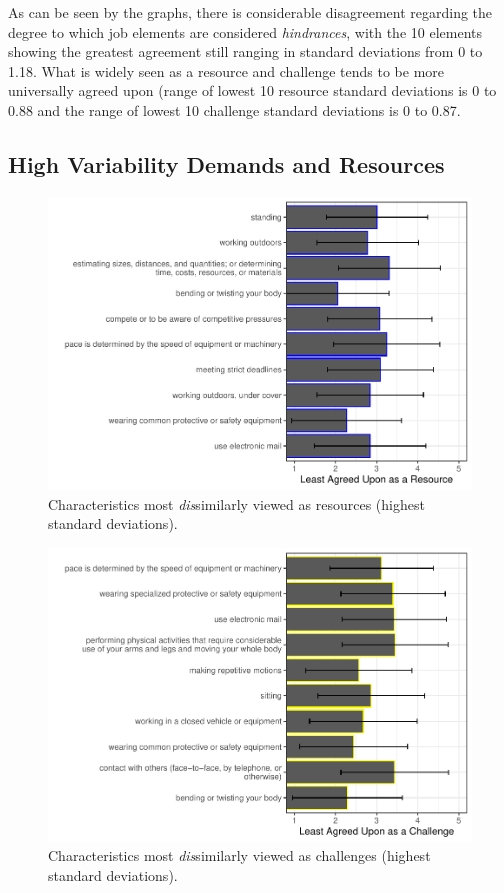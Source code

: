 \documentclass[
  man]{apa6}
\begin{document}
As can be seen by the graphs, there is considerable disagreement regarding the degree to which job elements are considered \emph{hindrances}, with the 10 elements showing the greatest agreement still ranging in standard deviations from 0 to 1.18. What is widely seen as a resource and challenge tends to be more universally agreed upon (range of lowest 10 resource standard deviations is 0 to 0.88 and the range of lowest 10 challenge standard deviations is 0 to 0.87.

\hypertarget{high-variability-demands-and-resources}{%
\subsection{High Variability Demands and Resources}\label{high-variability-demands-and-resources}}

\begin{figure}
\centering
\includegraphics{Submission_files/figure-latex/resourcesdisagree-1.pdf}
\caption{\label{fig:resourcesdisagree}Characteristics most \emph{dis}similarly viewed as resources (highest standard deviations).}
\end{figure}

\begin{figure}
\centering
\includegraphics{Submission_files/figure-latex/challengesdisagree-1.pdf}
\caption{\label{fig:challengesdisagree}Characteristics most \emph{dis}similarly viewed as challenges (highest standard deviations).}
\end{figure}
\end{document}
